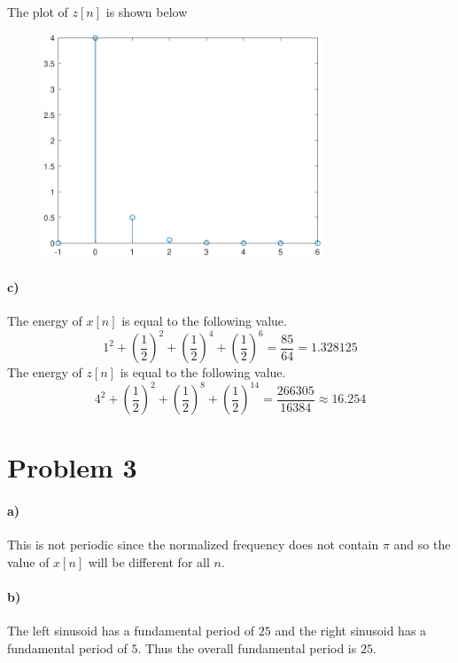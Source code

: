 \documentclass[12pt]{article}
\begin{document}
The plot of \(z[n]\) is shown below
\begin{figure}[H]
    \begin{center}
        \includegraphics[width=3.3in]{problem2b.pdf}
    \end{center}
\end{figure}

\paragraph{c)}

The energy of \(x[n]\) is equal to the following value.
\[1^2 + \left(\frac{1}{2}\right)^2 + \left(\frac{1}{2}\right)^4 + \left(\frac{1}{2}\right)^6 = \frac{85}{64} = 1.328125\]
The energy of \(z[n]\) is equal to the following value.
\[4^2 + \left(\frac{1}{2}\right)^2 + \left(\frac{1}{2}\right)^8 + \left(\frac{1}{2}\right)^{14} = \frac{266305}{16384} \approx 16.254\]

\section*{Problem 3}

\paragraph{a)}

This is not periodic since the normalized frequency does not contain \(\pi\) and so the value of \(x[n]\) will be different for all \(n\).

\paragraph{b)}

The left sinusoid has a fundamental period of \(25\) and the right sinusoid has a fundamental period of \(5\). Thus the overall fundamental
period is \(25\).
\end{document}
